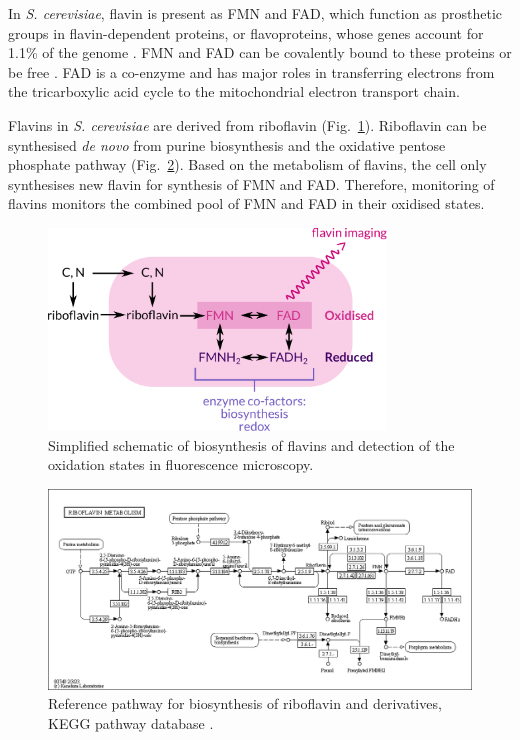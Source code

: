 In \textit{S. cerevisiae}, flavin is present as FMN and FAD, which function as prosthetic groups in flavin-dependent proteins, or flavoproteins, whose genes account for 1.1\% of the genome \parencite{gudipatiFlavoproteomeYeastSaccharomyces2014}.
FMN and FAD can be covalently bound to these proteins or be free \parencite{mewiesCovalentAttachmentFlavin1998}.
FAD is a co-enzyme and has major roles in transferring electrons from the tricarboxylic acid cycle to the mitochondrial electron transport chain.

Flavins in \textit{S. cerevisiae} are derived from riboflavin (Fig.\ \ref{fig:intro-flavin-schematic}).
Riboflavin can be synthesised \textit{de novo} from purine biosynthesis and the oxidative pentose phosphate pathway (Fig.\ \ref{fig:intro-flavin-kegg}).
Based on the metabolism of flavins, the cell only synthesises new flavin for synthesis of FMN and FAD\@.
Therefore, monitoring of flavins monitors the combined pool of FMN and FAD in their oxidised states.

\begin{figure}[ht!]
  \centering
  \includegraphics[width=0.8\textwidth]{flavin-cell-schematic}
  \caption[
    Simplified schematic of biosynthesis of flavins
  ]{
    Simplified schematic of biosynthesis of flavins and detection of the oxidation states in fluorescence microscopy.
    }
  \label{fig:intro-flavin-schematic}
\end{figure}

\begin{figure}[hb!]
  \centering
  \includegraphics[width=1.0\textwidth]{kegg-flavin}
  \caption[
    Reference pathway for biosynthesis of riboflavin and derivatives
  ]{
    Reference pathway for biosynthesis of riboflavin and derivatives, KEGG pathway database \parencite{kanehisaKEGGTaxonomybasedAnalysis2023}.
    }
  \label{fig:intro-flavin-kegg}
\end{figure}

